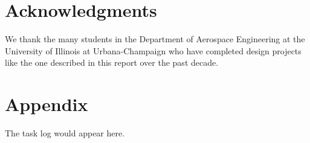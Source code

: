 \documentclass[conf]{new-aiaa}
\begin{document}
\section*{Acknowledgments}

We thank the many students in the Department of Aerospace Engineering at the University of Illinois at Urbana-Champaign who have completed design projects like the one described in this report over the past decade.



\section*{Appendix}

The task log would appear here.
\end{document}
